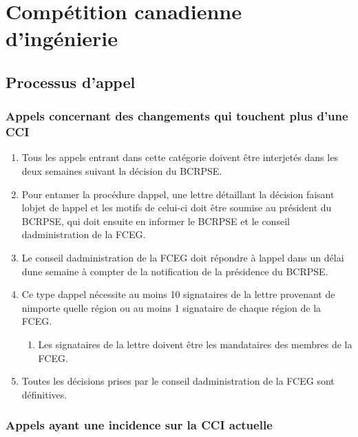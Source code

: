 \section{Compétition canadienne d'ingénierie}
\label{competition-canadienne-dingenierie}

\subsection{Processus d'appel}
\label{processus-dappel}

\subsubsection{Appels concernant des changements qui touchent plus d'une CCI}
\label{appels-concernant-des-changements-qui-touchent-plus-dune-cci}

\begin{enumerate}
 \item
  Tous les appels entrant dans cette catégorie doivent être interjetés dans les deux semaines suivant la décision du BCRPSE.
 \item
  Pour entamer la procédure d\textquotesingle appel, une lettre détaillant la décision faisant l\textquotesingle objet de l\textquotesingle appel et les motifs de celui-ci doit être soumise au président du BCRPSE, qui doit ensuite en informer le BCRPSE et le conseil d\textquotesingle administration de la FCEG.
 \item
  Le conseil d\textquotesingle administration de la FCEG doit répondre à l\textquotesingle appel dans un délai d\textquotesingle une semaine à compter de la notification de la présidence du BCRPSE.
 \item
  Ce type d\textquotesingle appel nécessite au moins 10 signataires de la lettre provenant de n\textquotesingle importe quelle région ou au moins 1 signataire de chaque région de la FCEG.

  \begin{enumerate}
   \item
    Les signataires de la lettre doivent être les mandataires des membres de la FCEG.
  \end{enumerate}

 \item
  Toutes les décisions prises par le conseil d\textquotesingle administration de la FCEG sont définitives.
\end{enumerate}

\subsubsection{Appels ayant une incidence sur la CCI actuelle}
\label{appels-ayant-une-incidence-sur-la-cci-actuel}

